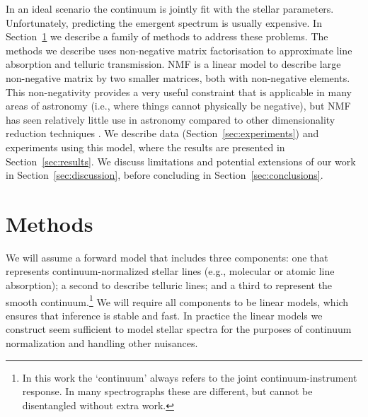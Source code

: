 \documentclass[modern,linenumbers]{aastex631}
\newcommand{\ajw}[1]{\textbf{#1}}
\begin{document}
In an ideal scenario the continuum is jointly fit with the stellar parameters. Unfortunately, predicting the emergent spectrum is usually expensive. In Section~\ref{sec:methods} we describe a family of methods to address these problems.
The methods we describe uses non-negative matrix factorisation \citep[NMF;][]{Lee_Seung:2000} to approximate line absorption and telluric transmission. NMF is a linear model to describe large non-negative matrix by two smaller matrices, both with non-negative elements. This non-negativity provides a very useful constraint that is applicable in many areas of astronomy (i.e., where things cannot physically be negative), but NMF has seen relatively little use in astronomy compared to other dimensionality reduction techniques \citep[however see, for example, ][]{Blanton:2007}.
We describe data (Section~\ref{sec:experiments}) and experiments using this model, where the results are presented in Section~\ref{sec:results}. We discuss limitations and potential extensions of our work in Section~\ref{sec:discussion}, before concluding in Section~\ref{sec:conclusions}.\\



\section{Methods}\label{sec:methods}

We will assume a forward model that includes three components: one that represents continuum-normalized stellar lines (e.g., molecular or atomic line absorption); a second to describe telluric lines; and a third to represent the smooth continuum.\footnote{In this work the `continuum' always refers to the joint continuum-instrument response. In many spectrographs these are different, but cannot be disentangled without extra work.} We will require all components to be linear models, which ensures that inference is stable and fast. In practice the linear models we construct seem sufficient to model stellar spectra for the purposes of continuum normalization and handling other nuisances.\\
\end{document}
